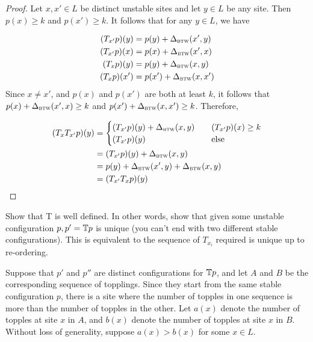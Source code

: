 \begin{proof}
Let $x,x'\in L$ be distinct unstable sites and let $y\in L$ be any site. Then $p(x)\ge k$ and $p(x') \ge k$. It follows that for any $y\in L$, we have 

\begin{align*}
    (T_{x'}p)(y)& = p(y) + \Delta_{\textsc{btw}}(x',y) \\
    (T_{x'}p)(x)& =p(x) + \Delta_{\textsc{btw}}(x',x) \\
    (T_{x}p)(y)& =p(y) + \Delta_{\textsc{btw}}(x,y) \\
    (T_{x}p)(x')& =p(x') + \Delta_{\textsc{btw}}(x,x')
\end{align*}
Since $x\ne x'$, and $p(x)$ and $p(x')$ are both at least $k$, it follows that $p(x) + \Delta_{\textsc{btw}}(x',x) \ge k$ and $p(x') + \Delta_{\textsc{btw}}(x,x') \ge k$.
Therefore,

\begin{align*}
    (T_xT_{x'}p)(y) & = 
    \begin{cases}
        (T_{x'}p)(y) + \Delta_{\textsc{btw}}(x,y) \quad & (T_{x'}p)(x)\ge k\\
        (T_{x'}p)(y) & \text{else}
    \end{cases}\\
    & = (T_{x'}p)(y) + \Delta_{\textsc{btw}}(x,y) \\
    & = p(y) + \Delta_{\textsc{btw}}(x',y) + \Delta_{\textsc{btw}}(x,y) \\
    & = (T_{x'}T_xp)(y) \qedhere
\end{align*} 
\end{proof}




\begin{question}
    Show that T is well defined. In other words, show that given some unstable configuration $p,p'=\mathbb{T} p$ is unique (you can’t end with two different stable configurations). This is equivalent to the sequence of $T_{x_i}$ required is unique up to re-ordering.
\end{question}

Suppose that $p'$ and $p''$ are distinct configurations for $\mathbb{T} p$, and let $A$ and $B$ be the corresponding sequence of topplings. Since they start from the same stable configuration $p$, there is a site where the number of topples in one sequence is more than the number of topples in the other. Let $a(x)$ denote the number of topples at site $x$ in $A$, and $b(x)$ denote the number of topples at site $x$ in $B$. Without loss of generality, suppose $a(x)>b(x)$ for some $x\in L$. 

